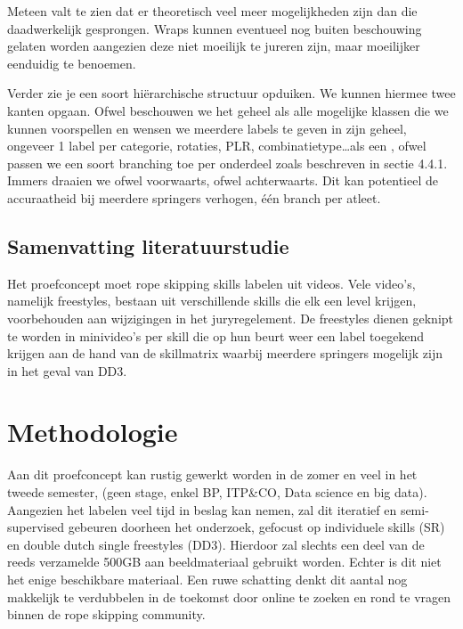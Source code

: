     
Meteen valt te zien dat er theoretisch veel meer mogelijkheden zijn dan die daadwerkelijk gesprongen. Wraps kunnen eventueel nog buiten beschouwing gelaten worden aangezien deze niet moeilijk te jureren zijn, maar moeilijker eenduidig te benoemen.

Verder zie je een soort hiërarchische structuur opduiken. We kunnen hiermee twee kanten opgaan. Ofwel beschouwen we het geheel als alle mogelijke klassen die we kunnen voorspellen en wensen we meerdere labels te geven in zijn geheel, ongeveer 1 label per categorie, rotaties, PLR, combinatietype\dots als een , ofwel passen we een soort branching toe per onderdeel zoals \textcite{Coulibaly_2022} beschreven in sectie 4.4.1. Immers draaien we ofwel voorwaarts, ofwel achterwaarts.
Dit kan potentieel de accuraatheid bij meerdere springers verhogen, één branch per atleet.

\subsection{Samenvatting literatuurstudie}
\label{subsec:samenvatting literatuur}

Het proefconcept moet rope skipping skills labelen uit videos. Vele video's, namelijk freestyles, bestaan uit verschillende skills die elk een level krijgen, voorbehouden aan wijzigingen in het juryregelement. De freestyles dienen geknipt te worden in minivideo's per skill die op hun beurt weer een label toegekend krijgen aan de hand van de skillmatrix waarbij meerdere springers mogelijk zijn in het geval van DD3.




\section{Methodologie}%
\label{sec:methodologie}

Aan dit proefconcept kan rustig gewerkt worden in de zomer en veel in het tweede semester, (geen stage, enkel BP, ITP\&CO, Data science en big data). Aangezien het labelen veel tijd in beslag kan nemen, zal dit iteratief en semi-supervised gebeuren doorheen het onderzoek, gefocust op individuele skills (SR) en double dutch single freestyles (DD3). Hierdoor zal slechts een deel van de reeds verzamelde 500GB aan beeldmateriaal gebruikt worden. Echter is dit niet het enige beschikbare materiaal. Een ruwe schatting denkt dit aantal nog makkelijk te verdubbelen in de toekomst door online te zoeken en rond te vragen binnen de rope skipping community.
    
